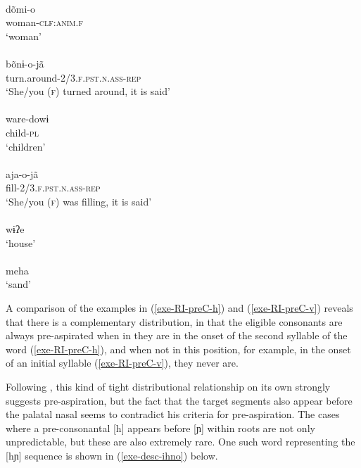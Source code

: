 \documentclass[output=paper]{langscibook}
\begin{document}
\begin{exe}
\ex\label{exe-RI-preC-v}
\columnsep=3pt
\begin{multicols}{2}\raggedcolumns
\begin{xlist}
\ex
\glll [t̰õ.mĩõ]\\
dõmi-o\\
woman-\textsc{clf:anim.f}\\
\trans `woman'\\
{\citep[164]{Bruil:2014}}
\ex
\glll [p̰õ.n\~ɨõ.ɲã]\\
bõnɨ-o-jã\\
turn.around-\textsc{2/3.f.pst.n.ass-rep}\\
\trans `She/you (\textsc{f}) turned around, it is said'\\
{\citep[20120918elicr003]{Bruil:2012}}
\ex
\glll [wa.ɾe.do.wɨ]\\
ware-dowɨ\\
child-\textsc{pl}\\
\trans `children'\\
{\citep[150]{Bruil:2014}}\columnbreak
\ex
\glll [a.jao.ɲã]\\
aja-o-jã\\
fill-\textsc{2/3.f.pst.n.ass-rep}\\
\trans `She/you (\textsc{f}) was filling, it is said'\\
{\citep[20120918elicr003]{Bruil:2012}}
\ex
\gll [wɨ.ʔe]\\
wɨʔe\\
\trans `house'\\
{\citep[119]{Bruil:2014}}
\ex
\gll [mẽ.h̃ã]\\
meha\\
\trans `sand'\\
{\citep[139]{Bruil:2014}}
\end{xlist}
\end{multicols}
\end{exe}

A comparison of the examples in (\ref{exe-RI-preC-h}) and (\ref{exe-RI-preC-v}) reveals that there is a complementary distribution, in that the eligible consonants are always pre-aspirated when in they are in the onset of the second syllable of the word (\ref{exe-RI-preC-h}), and when not in this position, for example, in the onset of an initial syllable (\ref{exe-RI-preC-v}), they never are.

Following \citet[9]{Clayton:2010}, this kind of tight distributional relationship on its own strongly suggests pre-aspiration, but the fact that the target segments also appear before the palatal nasal seems to contradict his criteria for pre-aspiration. The cases where a pre-consonantal [h] appears before [ɲ] within roots are not only unpredictable, but these are also extremely rare. One such word representing the [hɲ] sequence is shown in (\ref{exe-desc-ihno}) below. 
\end{document}
